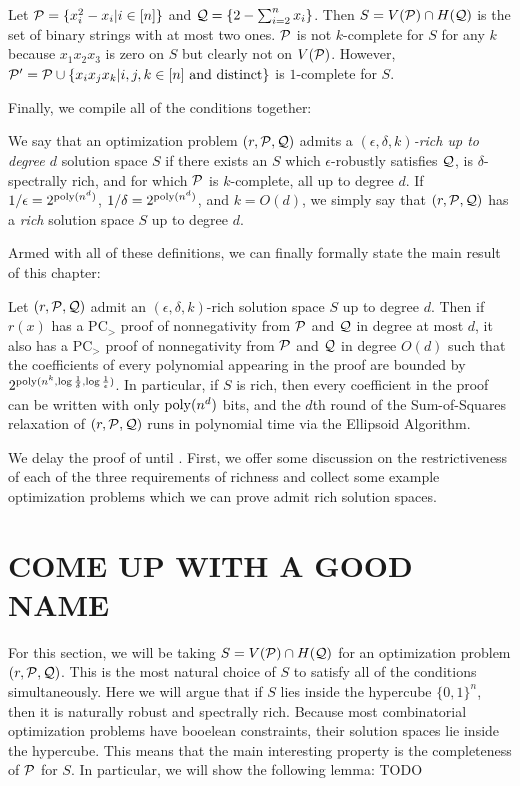 \begin{example}
Let $\mathcal P = \{x_i^2 - x_i | i \in [n]\}$ and $\mathcal Q = \{2 - \sum_{i=2}^n x_i\}$. Then $S = V(\mathcal P) \cap H(\mathcal Q)$ is the set of binary strings with at most two ones. $\mathcal P$ is not $k$-complete for $S$ for any $k$ because $x_1x_2x_3$ is zero on $S$ but clearly not on $V(\mathcal P)$. However, $\mathcal P' = \mathcal P \cup \{x_ix_jx_k | i,j,k \in [n] \text{ and distinct}\}$ is $1$-complete for $S$.
\end{example}

Finally, we compile all of the conditions together:
\begin{definition}
We say that an optimization problem $(r, \mathcal P, \mathcal Q)$ admits a \emph{$(\epsilon,\delta,k)$-rich up to degree $d$} solution space $S$ if there exists an $S$ which $\epsilon$-robustly satisfies $\mathcal Q$, is $\delta$-spectrally rich, and for which $\mathcal P$ is $k$-complete, all up to degree $d$. If $1/\epsilon = 2^{\operatorname{poly}(n^d)}$, $1/\delta = 2^{\operatorname{poly}(n^d)}$, and $k = O(d)$, we simply say that $(r, \mathcal P, \mathcal Q)$ has a \emph{rich} solution space $S$ up to degree $d$.
\end{definition}

Armed with all of these definitions, we can finally formally state the main result of this chapter:
\begin{theorem}\label{thm:bit_complexity-main}
Let $(r, \mathcal P, \mathcal Q)$ admit an $(\epsilon,\delta,k)$-rich solution space $S$ up to degree $d$. Then if $r(x)$ has a PC$_>$ proof of nonnegativity from $\mathcal P$ and $\mathcal Q$ in degree at most $d$, it also has a PC$_>$ proof of nonnegativity from $\mathcal P$ and $\mathcal Q$ in degree $O(d)$ such that the coefficients of every polynomial appearing in the proof are bounded by $2^{\operatorname{poly}(n^k, \log \frac{1}{\delta}, \log \frac{1}{\epsilon})}$. In particular, if $S$ is rich, then every coefficient in the proof can be written with only $\operatorname{poly}(n^d)$ bits, and the $d$th round of the Sum-of-Squares relaxation of $(r, \mathcal P, \mathcal Q)$ runs in polynomial time via the Ellipsoid Algorithm.
\end{theorem}

We delay the proof of  until . First, we offer some discussion on the restrictiveness of each of the three requirements of richness and collect some example optimization problems which we can prove admit rich solution spaces.

\section{COME UP WITH A GOOD NAME}
For this section, we will be taking $S = V(\mathcal P) \cap H(\mathcal Q)$ for an optimization problem $(r,\mathcal P,\mathcal Q)$. This is the most natural choice of $S$ to satisfy all of the conditions simultaneously. Here we will argue that if $S$ lies inside the hypercube $\{0,1\}^n$, then it is naturally robust and spectrally rich. Because most combinatorial optimization problems have booelean constraints, their solution spaces lie inside the hypercube. This means that the main interesting property is the completeness of $\mathcal P$ for $S$. In particular, we will show the following lemma: TODO
